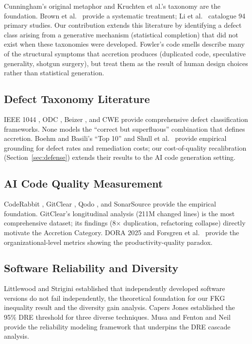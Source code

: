 \documentclass[11pt, a4paper, copyright]{googledeepmind}
\begin{document}
Cunningham's original metaphor \citep{cunningham1992} and Kruchten et al.'s taxonomy \citep{kruchten2012} are the foundation. Brown et al.\ \citep{brown2010} provide a systematic treatment; Li et al.\ \citep{li2015} catalogue 94 primary studies. Our contribution extends this literature by identifying a defect class arising from a generative mechanism (statistical completion) that did not exist when these taxonomies were developed. Fowler's code smells \citep{fowler1999} describe many of the structural symptoms that accretion produces (duplicated code, speculative generality, shotgun surgery), but treat them as the result of human design choices rather than statistical generation.

\subsection{Defect Taxonomy Literature}

IEEE 1044 \citep{ieee1044}, ODC \citep{chillarege1992}, Beizer \citep{beizer1990}, and CWE \citep{cwe2024} provide comprehensive defect classification frameworks. None models the ``correct but superfluous'' combination that defines accretion. Boehm and Basili's ``Top 10'' \citep{boehm2001} and Shull et al.\ \citep{shull2002} provide empirical grounding for defect rates and remediation costs; our cost-of-quality recalibration (Section~\ref{sec:defense}) extends their results to the AI code generation setting.

\subsection{AI Code Quality Measurement}

CodeRabbit \citep{coderabbit2025}, GitClear \citep{gitclear2025}, Qodo \citep{qodo2025}, and SonarSource \citep{sonar2026} provide the empirical foundation. GitClear's longitudinal analysis (211M changed lines) is the most comprehensive dataset; its findings (8$\times$ duplication, refactoring collapse) directly motivate the Accretion Category. DORA 2025 \citep{dora2025} and Forsgren et al.\ \citep{forsgren2018accelerate} provide the organizational-level metrics showing the productivity-quality paradox.

\subsection{Software Reliability and Diversity}

Littlewood and Strigini \citep{littlewood1993, littlewood2000} established that independently developed software versions do not fail independently, the theoretical foundation for our FKG inequality result and the diversity gain analysis. Capers Jones \citep{capersjones2012} established the 95\% DRE threshold for three diverse techniques. Musa \citep{musa1987} and Fenton and Neil \citep{fenton1999} provide the reliability modeling framework that underpins the DRE cascade analysis.
\end{document}
